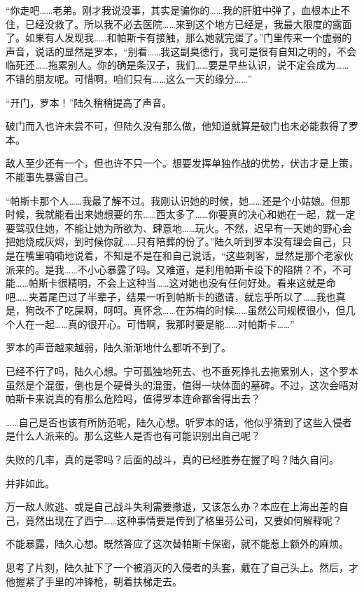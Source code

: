 “你走吧……老弟。刚才我说没事，其实是骗你的……我的肝脏中弹了，血根本止不住，已经没救了。所以我不必去医院……来到这个地方已经是，我最大限度的露面了。如果有人发现我……和帕斯卡有接触，那么她就完蛋了。”门里传来一个虚弱的声音，说话的显然是罗本，“别看……我这副臭德行，我可是很有自知之明的，不会临死还……拖累别人。你的确是条汉子，我们……要是早些认识，说不定会成为……不错的朋友呢。可惜啊，咱们只有……这么一天的缘分……”

“开门，罗本！”陆久稍稍提高了声音。

破门而入也许未尝不可，但陆久没有那么做，他知道就算是破门也未必能救得了罗本。

敌人至少还有一个，但也许不只一个。想要发挥单独作战的优势，伏击才是上策，不能事先暴露自己。

“帕斯卡那个人……我最了解不过。我刚认识她的时候，她……还是个小姑娘。但那时候，我就能看出来她想要的东……西太多了……你要真的决心和她在一起，就一定要驾驭住她，不能让她为所欲为、肆意地……玩火。不然，迟早有一天她的野心会把她烧成灰烬，到时候你就……只有陪葬的份了。”陆久听到罗本没有理会自己，只是在嘴里喃喃地说着，不知是不是在和自己说话，“这些刺客，显然是那个老家伙派来的。是我……不小心暴露了吗。又难道，是利用帕斯卡设下的陷阱？不，不可能……帕斯卡很精明，不会上这种当……这对她也没有任何好处。看来这就是命吧……夹着尾巴过了半辈子，结果一听到帕斯卡的邀请，就忘乎所以了……我也真是，狗改不了吃屎啊，呵呵。真怀念……在苏梅的时候……虽然公司规模很小，但几个人在一起……真的很开心。可惜啊，我那时要是能……对帕斯卡……”

罗本的声音越来越弱，陆久渐渐地什么都听不到了。

已经不行了吗，陆久心想。宁可孤独地死去、也不垂死挣扎去拖累别人，这个罗本虽然是个混蛋，倒也是个硬骨头的混蛋，值得一块体面的墓碑。不过，这次会晤对帕斯卡来说真的有那么危险吗，值得罗本连命都舍得出去？

……自己是否也该有所防范呢，陆久心想。听罗本的话，他似乎猜到了这些入侵者是什么人派来的。那么这些人是否也有可能识别出自己呢？

失败的几率，真的是零吗？后面的战斗，真的已经胜券在握了吗？陆久自问。

并非如此。

万一敌人败逃、或是自己战斗失利需要撤退，又该怎么办？本应在上海出差的自己，竟然出现在了西宁……这种事情要是传到了格里芬公司，又要如何解释呢？

不能暴露，陆久心想。既然答应了这次替帕斯卡保密，就不能惹上额外的麻烦。

思考了片刻，陆久扯下了一个被消灭的入侵者的头套，戴在了自己头上。然后，才他握紧了手里的冲锋枪，朝着扶梯走去。

\section*{}

